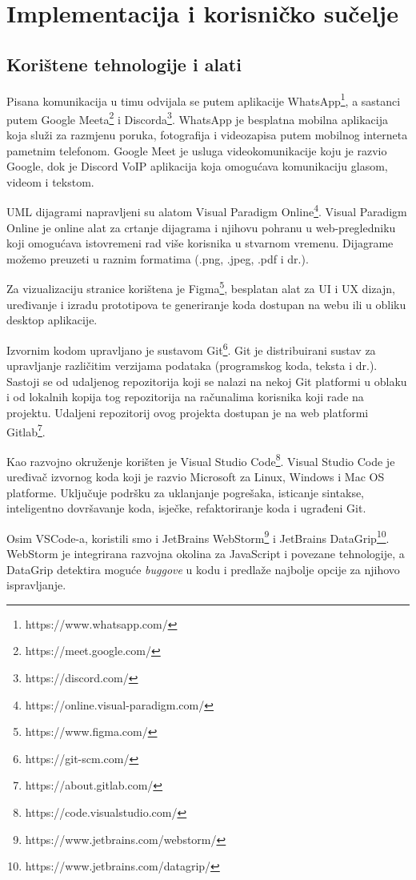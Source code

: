 ﻿\chapter{Implementacija i korisničko sučelje}
		
		
		\section{Korištene tehnologije i alati}
		Pisana komunikacija u timu odvijala se putem aplikacije WhatsApp\footnote{https://www.whatsapp.com/}, a sastanci putem Google Meeta\footnote{https://meet.google.com/} i Discorda\footnote{https://discord.com/}. WhatsApp je besplatna mobilna aplikacija koja služi za razmjenu poruka, fotografija i videozapisa putem mobilnog interneta pametnim telefonom. Google Meet je usluga videokomunikacije koju je razvio Google, dok je Discord VoIP aplikacija koja omogućava komunikaciju glasom, videom i tekstom.
		
		UML dijagrami napravljeni su alatom Visual Paradigm Online\footnote{https://online.visual-paradigm.com/}. Visual Paradigm Online je online alat za crtanje dijagrama i njihovu pohranu u web-pregledniku koji omogućava istovremeni rad više korisnika u stvarnom vremenu. Dijagrame možemo preuzeti u raznim formatima (.png, .jpeg, .pdf i dr.).
		
		Za vizualizaciju stranice korištena je Figma\footnote{https://www.figma.com/}, besplatan alat za UI i UX dizajn, uređivanje i izradu	prototipova te generiranje koda dostupan na webu ili u obliku desktop aplikacije.
		
		Izvornim kodom upravljano je sustavom Git\footnote{https://git-scm.com/}. Git je distribuirani sustav za upravljanje različitim	verzijama podataka (programskog koda, teksta i dr.). Sastoji se od udaljenog repozitorija koji se nalazi na nekoj Git platformi u oblaku i od lokalnih kopija tog repozitorija na računalima korisnika koji rade na projektu. Udaljeni repozitorij ovog projekta dostupan je na web platformi Gitlab\footnote{https://about.gitlab.com/}.
		
		Kao razvojno okruženje korišten je Visual Studio Code\footnote{https://code.visualstudio.com/}. Visual Studio Code
		je uređivač izvornog koda koji je razvio Microsoft za Linux, Windows i Mac OS platforme. Uključuje podršku za uklanjanje pogrešaka, isticanje sintakse, inteligentno dovršavanje koda, isječke, refaktoriranje koda i ugrađeni Git.
		
		Osim VSCode-a, koristili smo i JetBrains WebStorm\footnote{https://www.jetbrains.com/webstorm/} i JetBrains DataGrip\footnote{https://www.jetbrains.com/datagrip/}. WebStorm je integrirana razvojna okolina za JavaScript i povezane tehnologije, a DataGrip detektira moguće \textit{buggove} u kodu i predlaže najbolje opcije za njihovo ispravljanje.
		
